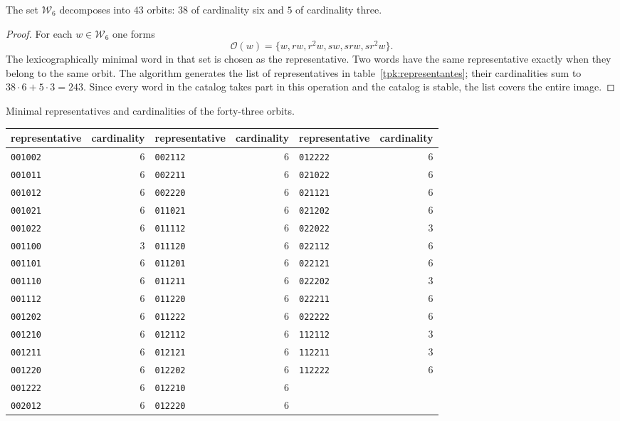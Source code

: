 \begin{proposicion}
\label{tpk:43}
The set \(\mathcal W_6\) decomposes into \(43\) orbits: \(38\)
of cardinality six and \(5\) of cardinality three.
\end{proposicion}
\begin{proof}
For each \(w\in\mathcal W_6\) one forms
\[
 \mathcal O(w)=\{w,rw,r^2w,sw,srw,sr^2w\}.
\]
The lexicographically minimal word in that set is chosen as the
representative. Two words have the same representative exactly when
they belong to the same orbit. The algorithm generates the list of representatives
in table~\ref{tpk:representantes}; their cardinalities sum to
\(38\cdot6+5\cdot3=243\). Since every word in the catalog takes part in
this operation and the catalog is stable, the list covers the entire image.
\end{proof}

\begin{tablacompleta}[htbp]
\caption{Minimal representatives and cardinalities of the forty-three orbits.}
\label{tpk:representantes}
\small
\begin{tabular}{@{}lr@{\qquad}lr@{\qquad}lr@{}}
\toprule
representative&cardinality&representative&cardinality&representative&cardinality\\
\midrule
\texttt{001002}&6&\texttt{002112}&6&\texttt{012222}&6\\
\texttt{001011}&6&\texttt{002211}&6&\texttt{021022}&6\\
\texttt{001012}&6&\texttt{002220}&6&\texttt{021121}&6\\
\texttt{001021}&6&\texttt{011021}&6&\texttt{021202}&6\\
\texttt{001022}&6&\texttt{011112}&6&\texttt{022022}&3\\
\texttt{001100}&3&\texttt{011120}&6&\texttt{022112}&6\\
\texttt{001101}&6&\texttt{011201}&6&\texttt{022121}&6\\
\texttt{001110}&6&\texttt{011211}&6&\texttt{022202}&3\\
\texttt{001112}&6&\texttt{011220}&6&\texttt{022211}&6\\
\texttt{001202}&6&\texttt{011222}&6&\texttt{022222}&6\\
\texttt{001210}&6&\texttt{012112}&6&\texttt{112112}&3\\
\texttt{001211}&6&\texttt{012121}&6&\texttt{112211}&3\\
\texttt{001220}&6&\texttt{012202}&6&\texttt{112222}&6\\
\texttt{001222}&6&\texttt{012210}&6&&\\
\texttt{002012}&6&\texttt{012220}&6&&\\
\bottomrule
\end{tabular}
\end{tablacompleta}

